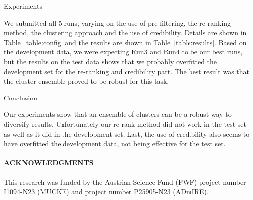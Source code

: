 \documentclass{acm_proc_article-me}
\begin{document}
\begin{section}{Experiments}

We submitted all 5 runs, varying on the use of pre-filtering, the re-ranking method, the clustering approach and the use of credibility.
Details are shown in Table~\ref{table:config} and the results are shown in Table~\ref{table:results}.
Based on the development data, we were expecting Run3 and Run4 to be our best runs, but the results on the test data shows that we probably 
overfitted the development set for the re-ranking and credibility part. The best result was that the cluster ensemble proved to be robust for this task.

%
%
\end{section}
\begin{section}{Conclusion}

Our experiments show that an ensemble of clusters can be a robust way to diversify results.
Unfortunately our re-rank method did not work in the test set as well as it did in the development set.
Last, the use of credibility also seems to have overfitted the development data, not being effective for the test set.

\end{section}

\paragraph{\textbf{ACKNOWLEDGMENTS}}
This research was funded by the Austrian Science Fund (FWF) project number I1094-N23 (MUCKE) and project number P25905-N23 (ADmIRE). 


  
\end{document}
